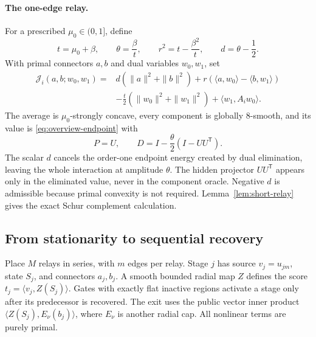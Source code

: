 \documentclass[11pt,letterpaper]{article}
\theoremstyle{definition}
\theoremstyle{remark}
\begin{document}
\paragraph{The one-edge relay.}
For a prescribed $\mu_0\in(0,1]$, define
\begin{equation}
 t=\mu_0+\beta,\qquad \theta=\frac\beta t,\qquad
 r^2=t-\frac{\beta^2}{t},\qquad d=\theta-\frac12.
 \label{eq:overview-short-parameters}
\end{equation}
With primal connectors $a,b$ and dual variables $w_0,w_1$, set
\begin{equation}
\begin{split}
 \mathcal J_i(a,b;w_0,w_1)
 ={}&d(\|a\|^2+\|b\|^2)
       +r(\langle a,w_0\rangle-\langle b,w_1\rangle)\\
 &-\frac t2(\|w_0\|^2+\|w_1\|^2)
       +\langle w_1,A_iw_0\rangle.
\end{split}
\label{eq:overview-short-relay}
\end{equation}
The average is $\mu_0$-strongly concave, every component is globally
$8$-smooth, and its value is \eqref{eq:overview-endpoint} with
\[
 P=U,\qquad D=I-\frac\theta2(I-UU^{\mathsf T}).
\]
The scalar $d$ cancels the order-one endpoint energy created by dual
elimination, leaving the whole interaction at amplitude $\theta$.
The hidden projector $UU^{\mathsf T}$ appears only in the eliminated
value, never in the component oracle. Negative $d$ is admissible because
primal convexity is not required. Lemma~\ref{lem:short-relay} gives the exact
Schur complement calculation.

\subsection{From stationarity to sequential recovery}

Place $M$ relays in series, with $m$ edges per relay. Stage $j$ has source
$v_j=u_{jm}$, state $S_j$, and connectors $a_j,b_j$. A smooth bounded radial
map $Z$ defines the score $t_j=\langle v_j,Z(S_j)\rangle$. Gates with exactly
flat inactive regions activate a stage only after its predecessor is
recovered. The exit uses the public vector inner product
$\langle Z(S_j),E_\nu(b_j)\rangle$, where $E_\nu$ is another radial cap.
All nonlinear terms are purely primal.
\end{document}

